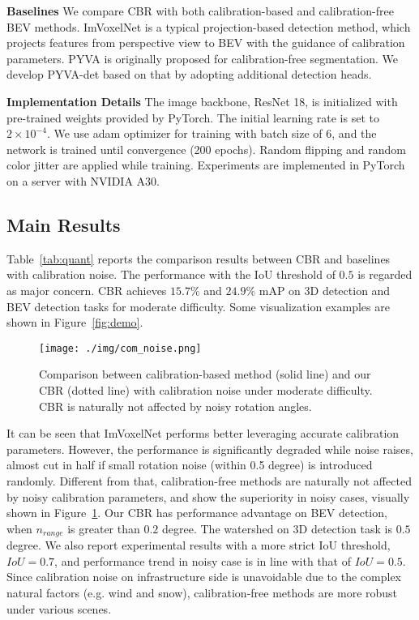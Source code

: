 \documentclass[letterpaper, 10 pt, conference]{ieeeconf}
\begin{document}
\textbf{Baselines}
We compare CBR with both calibration-based and calibration-free BEV methods. ImVoxelNet \cite{imvoxelnet} is a typical projection-based detection method, which projects features from perspective view to BEV with the guidance of calibration parameters. PYVA \cite{pyva} is originally proposed for calibration-free segmentation. We develop PYVA-det based on that by adopting additional detection heads.

\textbf{Implementation Details}
The image backbone, ResNet 18, is initialized with pre-trained weights provided by PyTorch. The initial learning rate is set to $2 \times 10^{-4}$. We use adam optimizer for training with batch size of 6, and the network is trained until convergence (200 epochs). Random flipping and random color jitter are applied while training. Experiments are implemented in PyTorch on a server with NVIDIA A30.

\subsection{Main Results}

Table~\ref{tab:quant} reports the comparison results between CBR and baselines with calibration noise. The performance with the IoU threshold of $0.5$ is regarded as major concern. CBR achieves $15.7\%$ and $24.9\%$ mAP on 3D detection and BEV detection tasks for moderate difficulty. Some visualization examples are shown in Figure~\ref{fig:demo}. 

\begin{figure}[ht]
  \centering
  \texttt{[image: ./img/com\_noise.png]}
  \caption{Comparison between calibration-based method \cite{imvoxelnet} (solid line) and our CBR (dotted line) with calibration noise under moderate difficulty. CBR is naturally not affected by noisy rotation angles.}
  \label{fig:com}
\end{figure}

It can be seen that ImVoxelNet \cite{imvoxelnet} performs better leveraging accurate calibration parameters. However, the performance is significantly degraded while noise raises, almost cut in half if small rotation noise (within 0.5 degree) is introduced randomly. Different from that, calibration-free methods are naturally not affected by noisy calibration parameters, and show the superiority in noisy cases, visually shown in Figure~\ref{fig:com}. Our CBR has performance advantage on BEV detection, when $n_{range}$ is greater than $0.2$ degree. The watershed on 3D detection task is $0.5$ degree. We also report experimental results with a more strict IoU threshold, $IoU=0.7$, and performance trend in noisy case is in line with that of $IoU=0.5$. Since calibration noise on infrastructure side is unavoidable due to the complex natural factors (e.g. wind and snow), calibration-free methods are more robust under various scenes. 
\end{document}
